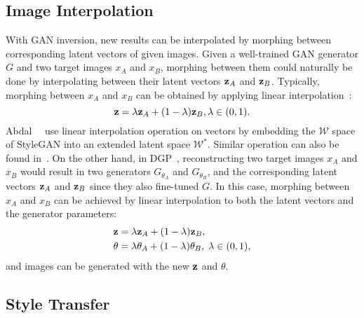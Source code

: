 \subsection{Image Interpolation}
\label{sec:interpolation}

With GAN inversion, new results can be interpolated by morphing between corresponding latent vectors of given images.
Given a well-trained GAN generator $G$ and two target images $x_{A}$ and $x_{B}$, morphing between them could naturally be done by interpolating between their latent vectors $\mathbf{z}_{A}$ and $\mathbf{z}_{B}$. 
Typically, morphing between $x_{A}$ and $x_{B}$ can be obtained by applying linear interpolation~\cite{xia2020gaze,pan2020exploiting}: 
\begin{equation}
\z=\lambda \z_{A}+(1-\lambda) \z_{B}, \lambda \in(0,1).
\label{eqn:interp}
\end{equation}
Abdal~\etal~\cite{abdal2019image2stylegan} use linear interpolation operation on vectors by embedding the $\mathcal{W}$ space of StyleGAN into an extended latent space $\mathcal{W^{*}}$.
Similar operation can also be found in~\cite{nitzan2020harness}.
On the other hand, in DGP~\cite{pan2020exploiting}, reconstructing two target images $x_{A}$ and $x_{B}$ would result in two generators $G_{\theta_{A}}$ and $G_{\theta_{B}}$, and the corresponding latent vectors $\mathbf{z}_{A}$ and $\mathbf{z}_{B}$ since they also fine-tuned $G$. 
In this case, morphing between $x_{A}$ and $x_{B}$ can be achieved by linear interpolation to both the latent vectors and the generator parameters: 
\begin{equation}
\begin{aligned}
\z&=\lambda \z_{A}+(1-\lambda) \z_{B},\\ \theta&=\lambda \theta_{A}+(1-\lambda) \theta_{B}, \; \lambda \in(0,1),
\end{aligned}
\label{eqn:interp_dgp}
\end{equation}
and images can be generated with the new $\mathbf{z}$ and $\theta$.

\subsection{Style Transfer}
\label{sec:style_tranfer}


